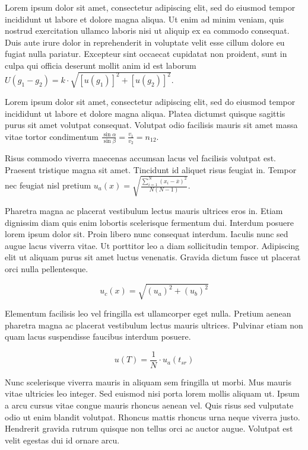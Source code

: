 \documentclass{article}
\begin{document}
	
   Lorem ipsum dolor sit amet, consectetur adipiscing elit, sed do eiusmod tempor incididunt ut labore et dolore magna aliqua. Ut enim ad minim veniam, quis nostrud exercitation ullamco laboris nisi ut aliquip ex ea commodo consequat. Duis aute irure dolor in reprehenderit in voluptate velit esse cillum dolore eu fugiat nulla pariatur. Excepteur sint occaecat cupidatat non proident, sunt in culpa qui officia deserunt mollit anim id est laborum 
   \begin{math}
   U(g_1-g_2)=k\cdot \sqrt{[u(g_1)]^2+[u(g_2)]^2}
    \end{math}.
    \newline
    
    
    Lorem ipsum dolor sit amet, consectetur adipiscing elit, sed do eiusmod tempor incididunt ut labore et dolore magna aliqua. Platea dictumst quisque sagittis purus sit amet volutpat consequat. Volutpat odio facilisis mauris sit amet massa vitae tortor condimentum $ \frac{\sin \alpha}{\sin \beta}=\frac{v_1}{v_2}=n_{12} $.
    \newline
    
    Risus commodo viverra maecenas accumsan lacus vel facilisis volutpat est. Praesent tristique magna sit amet. Tincidunt id aliquet risus feugiat in. Tempor nec feugiat nisl pretium \( u_a(x)=\sqrt{\frac{\sum_{i=1}^{N} (x_i-\overline{x})^2}{N(N-1)}} \).
    \newline
    
    Pharetra magna ac placerat vestibulum lectus mauris ultrices eros in. Etiam dignissim diam quis enim lobortis scelerisque fermentum dui. Interdum posuere lorem ipsum dolor sit. Proin libero nunc consequat interdum. Iaculis nunc sed augue lacus viverra vitae. Ut porttitor leo a diam sollicitudin tempor. Adipiscing elit ut aliquam purus sit amet luctus venenatis. Gravida dictum fusce ut placerat orci nulla pellentesque.
    
    \[ u_c(x)=\sqrt{(u_a)^2+(u_b)^2}  \]
    
    Elementum facilisis leo vel fringilla est ullamcorper eget nulla. Pretium aenean pharetra magna ac placerat vestibulum lectus mauris ultrices. Pulvinar etiam non quam lacus suspendisse faucibus interdum posuere. 
    
    $$ u(T)=\frac{1}{N} \cdot u_a (t_{sr}) $$
    
    Nunc scelerisque viverra mauris in aliquam sem fringilla ut morbi. Mus mauris vitae ultricies leo integer. Sed euismod nisi porta lorem mollis aliquam ut. Ipsum a arcu cursus vitae congue mauris rhoncus aenean vel. Quis risus sed vulputate odio ut enim blandit volutpat. Rhoncus mattis rhoncus urna neque viverra justo. Hendrerit gravida rutrum quisque non tellus orci ac auctor augue. Volutpat est velit egestas dui id ornare arcu. 
    
\end{document}
